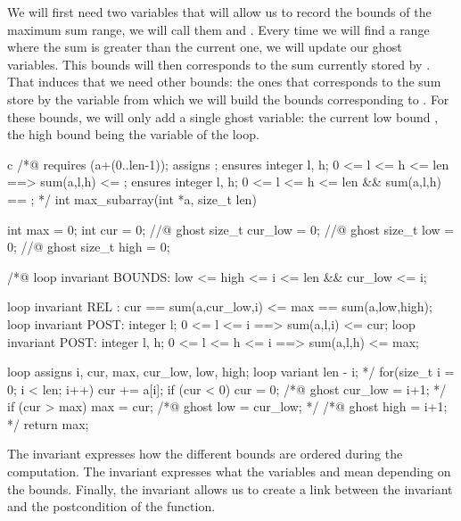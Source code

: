 \documentclass[middle]{zmdocument}
\begin{document}
We will first need two variables that will allow us to record the bounds
of the maximum sum range, we will call them  and
. Every time we will find a range where the sum is greater
than the current one, we will update our ghost variables. This bounds
will then corresponds to the sum currently stored by . That
induces that we need other bounds: the ones that corresponds to the sum
store by the variable  from which we will build the bounds
corresponding to . For these bounds, we will only add a
single ghost variable: the current low bound , the high
bound being the variable  of the loop.



\begin{CodeBlock}{c}
/*@ 
  requires \valid(a+(0..len-1));
  assigns \nothing;
  ensures \forall integer l, h;  0 <= l <= h <= len ==> sum(a,l,h) <= \result;
  ensures \exists integer l, h;  0 <= l <= h <= len &&  sum(a,l,h) == \result;
*/
int max_subarray(int *a, size_t len) {
  int max = 0;
  int cur = 0;
  //@ ghost size_t cur_low = 0; 
  //@ ghost size_t low = 0;
  //@ ghost size_t high = 0; 

  /*@ 
    loop invariant BOUNDS: low <= high <= i <= len && cur_low <= i;
    
    loop invariant REL :   cur == sum(a,cur_low,i) <= max == sum(a,low,high);
    loop invariant POST:   \forall integer l;    0 <= l <= i      ==> sum(a,l,i) <= cur;
    loop invariant POST:   \forall integer l, h; 0 <= l <= h <= i ==> sum(a,l,h) <= max;
   
    loop assigns i, cur, max, cur_low, low, high;
    loop variant len - i; 
  */
  for(size_t i = 0; i < len; i++) {
    cur += a[i];
    if (cur < 0) {
      cur = 0;
      /*@ ghost cur_low = i+1; */
    }
    if (cur > max) {
      max = cur;
      /*@ ghost low = cur_low; */
      /*@ ghost high = i+1; */
    }
  }
  return max;
}
\end{CodeBlock}



The invariant  expresses how the different bounds are
ordered during the computation. The invariant  expresses
what the variables  and  mean depending on the
bounds. Finally, the invariant  allows us to create a link
between the invariant and the postcondition of the function.
\end{document}
